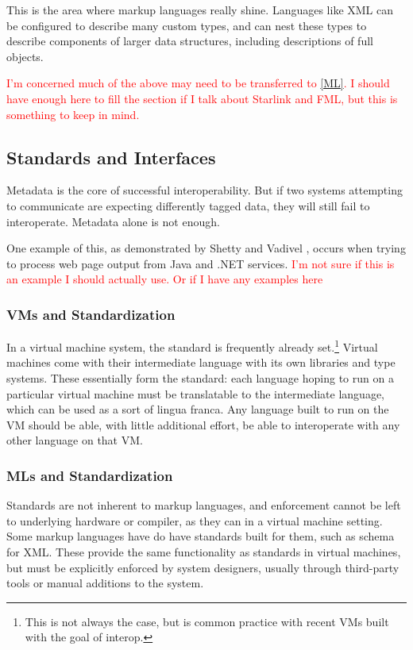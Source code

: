 \documentclass{sig-alternate}
\newcommand{\mycomment}[1]{\textcolor{red}{#1}}
\begin{document}
This is the area where markup languages really shine. Languages like XML can be configured to describe many custom types, and can nest these types to describe components of larger data structures, including descriptions of full objects.

\mycomment{I'm concerned much of the above may need to be transferred to \ref{ML}. I should have enough here to fill the section if I talk about Starlink and FML, but this is something to keep in mind.}

\subsection{Standards and Interfaces}\label{standards}
Metadata is the core of successful interoperability. But if two systems attempting to communicate are expecting differently tagged data, they will still fail to interoperate. Metadata alone is not enough.

One example of this, as demonstrated by Shetty and Vadivel \cite{Shetty:2009}, occurs when trying to process web page output from Java and .NET services. \mycomment{I'm not sure if this is an example I should actually use. Or if I have any examples here}

\subsubsection*{VMs and Standardization}
In a virtual machine system, the standard is frequently already set.\footnote{This is not always the case, but is common practice with recent VMs built with the goal of interop.} Virtual machines come with their intermediate language with its own libraries and type systems. These essentially form the standard: each language hoping to run on a particular virtual machine must be translatable to the intermediate language, which can be used as a sort of lingua franca. Any language built to run on the VM should be able, with little additional effort, be able to interoperate with any other language on that VM.


\subsubsection*{MLs and Standardization}
Standards are not inherent to markup languages, and enforcement cannot be left to underlying hardware or compiler, as they can in a virtual machine setting. Some markup languages have do have standards built for them, such as schema for XML. These provide the same functionality as standards in virtual machines, but must be explicitly enforced by system designers, usually through third-party tools or manual additions to the system.
\end{document}
